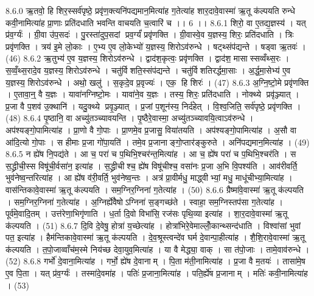 8.6.0
ऋ॒तवो॒ हि शिर॒स्सर्व॑पृष्ठे॒ प्रवृ॑ण॒क्त्यनि॑पद्यमान॒मित्या॑ह ग॒तेत्या॑ह शार॒दावे॒वास्मा॑ ऋ॒तू क॑ल्पयति रुन्धे कवी॒नामित्या॑ह प्रा॒णाः प्रति॑दधाति भवन्ति वाचयति च॒त्वारि॑ च ।। 6 ।।
8.6.1
शिरो॒ वा ए॒तद्य॒ज्ञस्य॑ । यत् प्र॑व॒र्ग्यः॑ । ग्री॒वा उ॑प॒सदः॑ । पु॒रस्ता॑दुप॒सदां प्रव॒र्ग्यं॑ प्रवृ॑णक्ति । ग्री॒वास्वे॒व य॒ज्ञस्य॒ शिरः॒ प्रति॑दधाति । त्रिः प्रवृ॑णक्ति । त्रय॑ इ॒मे लो॒काः । ए॒भ्य ए॒व लो॒केभ्यो॑ य॒ज्ञस्य॒ शिरोऽव॑रुन्धे । षट्थ्संप॑द्यन्ते । षड्वा ऋ॒तवः॑ । (46)
8.6.2
ऋ॒तुभ्य॑ ए॒व य॒ज्ञस्य॒ शिरोऽव॑रुन्धे । द्वाद॑श॒कृत्वः॒ प्रवृ॑णक्ति । द्वाद॑श॒ मासास्सव्वँथ्स॒रः । स॒व्वँ॒थ्स॒रादे॒व य॒ज्ञस्य॒ शिरोऽव॑रुन्धे । चतु॑र्विशति॒स्संप॑द्यन्ते । चतु॑र्विशतिरर्द्धमा॒साः । अ॒र्द्ध॒मा॒सेभ्य॑ ए॒व य॒ज्ञस्य॒ शिरोऽव॑रुन्धे । अथो॒ खलु॑ । स॒कृदे॒व प्र॒वृज्यः॑ । एक॒ हि शिरः॑ । (47)
8.6.3
अ॒ग्नि॒ष्टो॒मे प्रवृ॑णक्ति । ए॒तावा॒न्॒ वै य॒ज्ञः । यावा॑नग्निष्टो॒मः । यावा॑ने॒व य॒ज्ञः । तस्य॒ शिरः॒ प्रति॑दधाति । नोक्थ्ये प्रवृ॑ञ्ज्यात् । प्र॒जा वै प॒शव॑ उ॒क्थानि॑ । यदु॒क्थ्ये प्रवृ॒ञ्ज्यात् । प्र॒जां प॒शून॑स्य॒ निर्द॑हेत् । वि॒श्व॒जिति॒ सर्व॑पृष्ठे॒ प्रवृ॑णक्ति । (48)
8.6.4
पृ॒ष्ठानि॒ वा अच्यु॑तञ्च्यावयन्ति । पृ॒ष्ठैरे॒वास्मा॒ अच्यु॑तञ्च्यावयि॒त्वाऽव॑रुन्धे । अप॑श्यङ्गो॒पामित्या॑ह । प्रा॒णो वै गो॒पाः । प्रा॒णमे॒व प्र॒जासु॒ विया॑तयति । अप॑श्यङ्गो॒पामित्या॑ह । अ॒सौ वा आ॑दि॒त्यो गो॒पाः । स हीमाः प्र॒जा गो॑पा॒यति॑ । तमे॒व प्र॒जानाङ्गो॒प्तार॑ङ्कुरुते । अनि॑पद्यमान॒मित्या॑ह । (49)
8.6.5
न ह्ये॑ष नि॒पद्य॑ते । आ च॒ परा॑ च प॒थिभि॒श्चर॑न्त॒मित्या॑ह । आ च॒ ह्ये॑ष परा॑ च प॒थिभि॒श्चर॑ति । स स॒द्ध्रीची॒स्स विषू॑ची॒र्वसा॑न॒ इत्या॑ह । स॒द्ध्रीचीश्च॒ ह्ये॑ष विषू॑चीश्च॒ वसा॑नः प्र॒जा अ॒भि वि॒पश्य॑ति । आव॑रीवर्ति॒ भुव॑नेष्व॒न्तरित्या॑ह । आ ह्ये॑ष व॑री॒वर्ति॒ भुव॑नेष्व॒न्तः । अत्र॑ प्रा॒वीर्मधु॒ माद्ध्वीभ्यां॒ मधु॒ माधू॑चीभ्या॒मित्या॑ह । वास॑न्तिकावे॒वास्मा॑ ऋ॒तू क॑ल्पयति । सम॒ग्निर॒ग्निना॑ ग॒तेत्या॑ह । (50)
8.6.6
ग्रैष्मा॑वे॒वास्मा॑ ऋ॒तू क॑ल्पयति । सम॒ग्निर॒ग्निना॑ ग॒तेत्या॑ह । अ॒ग्निर्ह्ये॑वैषोऽग्निना॑ स॒ङ्गच्छ॑ते । स्वाहा॒ सम॒ग्निस्तप॑सा ग॒तेत्या॑ह । पूर्व॑मे॒वादि॒तम् । उत्त॑रेणा॒भिगृ॑णाति । ध॒र्ता दि॒वो विभा॑सि॒ रज॑सः पृथि॒व्या इत्या॑ह । शा॒र॒दावे॒वास्मा॑ ऋ॒तू क॑ल्पयति । (51)
8.6.7
दि॒वि दे॒वेषु॒ होत्रा॑ य॒च्छेत्या॑ह । होत्रा॑भिरे॒वेमाल्लोँ॒कान्थ्सन्द॑धाति । विश्वा॑सां भुवां पत॒ इत्या॑ह । हैम॑न्तिकावे॒वास्मा॑ ऋ॒तू क॑ल्पयति । दे॒व॒श्रूस्त्वन्दे॑व घर्म दे॒वान्पा॒हीत्या॑ह । शै॒शि॒रावे॒वास्मा॑ ऋ॒तू क॑ल्पयति । त॒पो॒जाव्वाँच॑म॒स्मे निय॑च्छ देवा॒युव॒मित्या॑ह । या वै मेद्ध्या॒ वाक् । सा त॑पो॒जाः । तामे॒वाव॑रुन्धे । (52)
8.6.8
गर्भो॑ दे॒वाना॒मित्या॑ह । गर्भो॒ ह्ये॑ष दे॒वानाम् । पि॒ता म॑ती॒नामित्या॑ह । प्र॒जा वै म॒तयः॑ । तासा॑मे॒ष ए॒व पि॒ता । यत् प्र॑व॒र्ग्यः॑ । तस्मा॑दे॒वमा॑ह । पतिः॑ प्र॒जाना॒मित्या॑ह । पति॒र्ह्ये॑ष प्र॒जानाम् । मतिः॑ कवी॒नामित्या॑ह । (53)
